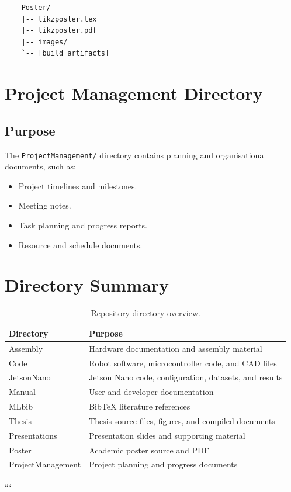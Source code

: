 \begin{verbatim}
	Poster/
	|-- tikzposter.tex
	|-- tikzposter.pdf
	|-- images/
	`-- [build artifacts]
\end{verbatim}

\section{Project Management Directory}

\subsection{Purpose}

The \texttt{ProjectManagement/} directory contains planning and organisational documents, such as:

\begin{itemize}
	\item Project timelines and milestones.
	\item Meeting notes.
	\item Task planning and progress reports.
	\item Resource and schedule documents.
\end{itemize}

\section{Directory Summary}

\begin{table}[htbp]
	\centering
	\renewcommand{\arraystretch}{1.2}
	\begin{tabular}{|p{3cm}|p{8cm}|}
		\hline
		\textbf{Directory} & \textbf{Purpose} \\
		\hline
		Assembly & Hardware documentation and assembly material \\
		\hline
		Code & Robot software, microcontroller code, and CAD files \\
		\hline
		JetsonNano & Jetson Nano code, configuration, datasets, and results \\
		\hline
		Manual & User and developer documentation \\
		\hline
		MLbib & Bib\TeX{} literature references \\
		\hline
		Thesis & Thesis source files, figures, and compiled documents \\
		\hline
		Presentations & Presentation slides and supporting material \\
		\hline
		Poster & Academic poster source and PDF \\
		\hline
		ProjectManagement & Project planning and progress documents \\
		\hline
	\end{tabular}
	\caption{Repository directory overview.}
	\label{tab:directory-organization}
\end{table}
```